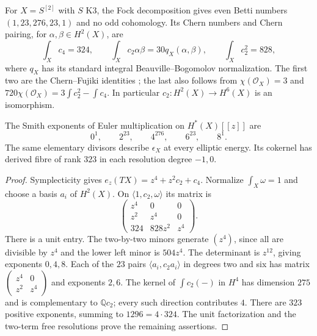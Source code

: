 For $X=S^{[2]}$ with $S$ K3, the Fock decomposition gives
even Betti numbers $(1,23,276,23,1)$ and no odd cohomology.
Its Chern numbers and Chern pairing, for $\alpha,\beta\in H^2(X)$, are
\begin{equation}\label{cyprim:eq:Hilbert-square-Chern}
 \int_Xc_4=324,\qquad
 \int_Xc_2\alpha\beta=30q_X(\alpha,\beta),\qquad
 \int_Xc_2^2=828,
\end{equation}
where $q_X$ has its standard integral Beauville--Bogomolov
normalization. The first two are the Chern--Fujiki
identities \cite[Theorem~4.2]{rewriteCOT2023}; the last
also follows from $\chi(\mathcal O_X)=3$ and
$720\chi(\mathcal O_X)=3\int c_2^2-\int c_4$.
In particular $c_2:H^2(X)\to H^6(X)$ is an isomorphism.

\begin{proposition}\label{cyprim:prop:Hilbert-square-Smith}
The Smith exponents of Euler multiplication on $H^*(X)[[z]]$
are
\[
 0^1,\qquad2^{23},\qquad4^{276},\qquad6^{23},\qquad8^1.
\]
The same elementary divisors describe $\epsilon_X$ at
every elliptic energy. Its cokernel has derived fibre of
rank $323$ in each resolution degree $-1,0$.
\end{proposition}

\begin{proof}
Symplecticity gives $e_z(TX)=z^4+z^2c_2+c_4$.
Normalize $\int_X\omega=1$ and choose a basis $a_i$ of $H^2(X)$.
On $\langle1,c_2,\omega\rangle$ its matrix is
\[
 \begin{pmatrix}z^4&0&0\\z^2&z^4&0\\324&828z^2&z^4\end{pmatrix}.
\]
There is a unit entry. The two-by-two minors generate
$(z^4)$, since all are divisible by $z^4$ and the lower
left minor is $504z^4$. The determinant is $z^{12}$,
giving exponents $0,4,8$.
Each of the $23$ pairs $\langle a_i,c_2a_i\rangle$ in
degrees two and six has matrix
$\left(\begin{smallmatrix}z^4&0\\z^2&z^4\end{smallmatrix}\right)$
and exponents $2,6$. The kernel of $\int c_2(-)$ in
$H^4$ has dimension $275$ and is complementary to
$\mathbb Qc_2$; every such direction contributes $4$.
There are $323$ positive exponents, summing to
$1296=4\cdot324$. The unit factorization and the
two-term free resolutions prove the remaining assertions.
\end{proof}

